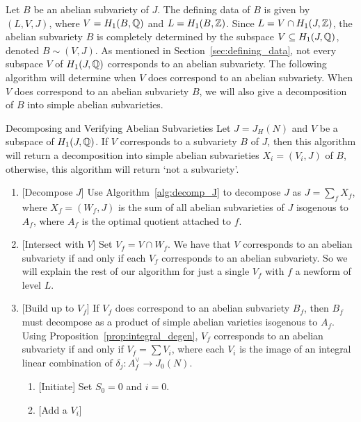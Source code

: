 Let $B$ be an abelian subvariety of $J$. The defining data of $B$ is given by
$(L, V, J)$, where $V=H_1(B,\mathbb{Q})$ and $L = H_1(B, \mathbb{Z})$. Since $L = V\cap
H_1(J, \mathbb{Z})$, the abelian subvariety $B$ is completely determined by the
subspace $V\subseteq H_1(J, \mathbb{Q})$, denoted $B\sim (V, J)$. As mentioned in
Section~\ref{sec:defining_data}, not every subspace $V$ of $H_1(J, \mathbb{Q})$
corresponds to an abelian subvariety. The following algorithm will determine
when $V$ does correspond to an abelian subvariety. When $V$ does correspond to
an abelian subvariety $B$, we will also give a decomposition of $B$ into simple
abelian subvarieties.

\begin{algorithm}{Decomposing and Verifying Abelian Subvarieties}
    \label{alg:decomp_and_verify_subvarieties}
    Let $J=J_H(N)$ and $V$ be a subspace of $H_1(J, \mathbb{Q})$. If $V$ corresponds
    to a subvariety $B$ of $J$, then this algorithm will return a decomposition
    into simple abelian subvarieties $X_i=(V_i, J)$ of $B$, otherwise, this
    algorithm will return `not a subvariety'.
    \begin{enumerate}
        \item{} [Decompose $J$]
            Use Algorithm~\ref{alg:decomp_J} to decompose $J$ as $J=\sum_f
            X_f$, where $X_f=(W_f, J)$ is the sum of all abelian subvarieties
            of $J$ isogenous to $A_f$, where $A_f$ is the optimal quotient
            attached to $f$.
        \item{} [Intersect with $V$]
            Set $V_f=V\cap W_f$. We have that $V$ corresponds to an abelian
            subvariety if and only if each $V_f$ corresponds to an abelian
            subvariety. So we will explain the rest of our algorithm for just a
            single $V_f$ with $f$ a newform of level $L$.
        \item{} [Build up to $V_f$]
            If $V_f$ does correspond to an abelian subvariety $B_f$, then $B_f$
            must decompose as a product of simple abelian varieties isogenous
            to $A_f$. Using Proposition~\ref{prop:integral_degen}, $V_f$
            corresponds to an abelian subvariety if and only if $V_f=\sum V_i$,
            where each $V_i$ is the image of an integral linear combination of
            $\delta_j:A_f ^\vee \to J_0(N)$.
            \begin{enumerate}
                \item{} [Initiate]
                    Set $S_0=0$ and $i=0$.
                \item{} [Add a $V_i$]

\end{enumerate}
\end{enumerate}
\end{algorithm}
